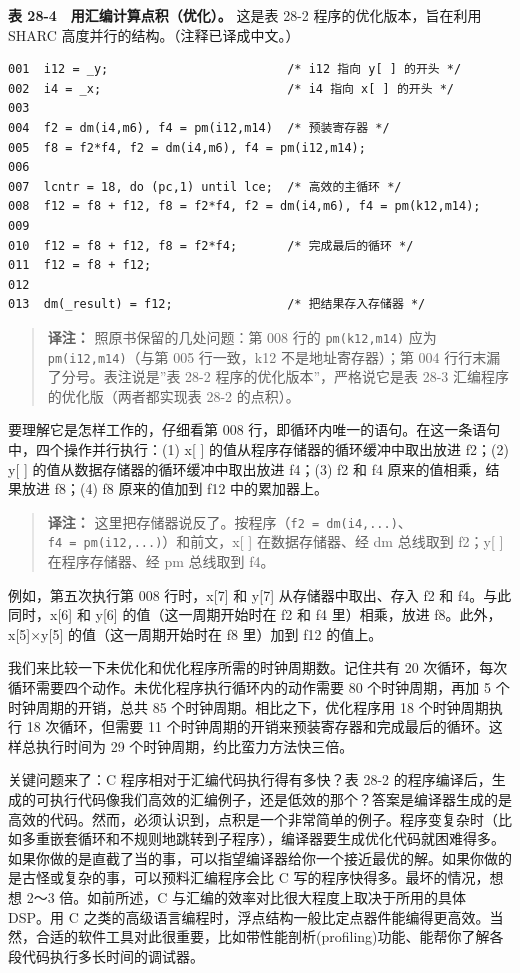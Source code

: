 \textbf{表 28-4　用汇编计算点积（优化）。} 这是表 28-2
程序的优化版本，旨在利用 SHARC 高度并行的结构。（注释已译成中文。）

\begin{verbatim}
001  i12 = _y;                         /* i12 指向 y[ ] 的开头 */
002  i4 = _x;                          /* i4 指向 x[ ] 的开头 */
003
004  f2 = dm(i4,m6), f4 = pm(i12,m14)  /* 预装寄存器 */
005  f8 = f2*f4, f2 = dm(i4,m6), f4 = pm(i12,m14);
006
007  lcntr = 18, do (pc,1) until lce;  /* 高效的主循环 */
008  f12 = f8 + f12, f8 = f2*f4, f2 = dm(i4,m6), f4 = pm(k12,m14);
009
010  f12 = f8 + f12, f8 = f2*f4;       /* 完成最后的循环 */
011  f12 = f8 + f12;
012
013  dm(_result) = f12;                /* 把结果存入存储器 */
\end{verbatim}

\begin{quote}
\textbf{译注：} 照原书保留的几处问题：第 008 行的 \texttt{pm(k12,m14)}
应为 \texttt{pm(i12,m14)}（与第 005 行一致，k12 不是地址寄存器）；第 004
行行末漏了分号。表注说是''表 28-2 程序的优化版本''，严格说它是表 28-3
汇编程序的优化版（两者都实现表 28-2 的点积）。
\end{quote}

要理解它是怎样工作的，仔细看第 008
行，即循环内唯一的语句。在这一条语句中，四个操作并行执行：(1) x{[} {]}
的值从程序存储器的循环缓冲中取出放进 f2；(2) y{[} {]}
的值从数据存储器的循环缓冲中取出放进 f4；(3) f2 和 f4
原来的值相乘，结果放进 f8；(4) f8 原来的值加到 f12 中的累加器上。

\begin{quote}
\textbf{译注：}
这里把存储器说反了。按程序（\texttt{f2\ =\ dm(i4,...)}、\texttt{f4\ =\ pm(i12,...)}）和前文，x{[}
{]} 在数据存储器、经 dm 总线取到 f2；y{[} {]} 在程序存储器、经 pm
总线取到 f4。
\end{quote}

例如，第五次执行第 008 行时，x{[}7{]} 和 y{[}7{]} 从存储器中取出、存入
f2 和 f4。与此同时，x{[}6{]} 和 y{[}6{]} 的值（这一周期开始时在 f2 和 f4
里）相乘，放进 f8。此外，x{[}5{]}×y{[}5{]} 的值（这一周期开始时在 f8
里）加到 f12 的值上。

我们来比较一下未优化和优化程序所需的时钟周期数。记住共有 20
次循环，每次循环需要四个动作。未优化程序执行循环内的动作需要 80
个时钟周期，再加 5 个时钟周期的开销，总共 85
个时钟周期。相比之下，优化程序用 18 个时钟周期执行 18 次循环，但需要 11
个时钟周期的开销来预装寄存器和完成最后的循环。这样总执行时间为 29
个时钟周期，约比蛮力方法快三倍。

关键问题来了：C 程序相对于汇编代码执行得有多快？表 28-2
的程序编译后，生成的可执行代码像我们高效的汇编例子，还是低效的那个？答案是编译器生成的是高效的代码。然而，必须认识到，点积是一个非常简单的例子。程序变复杂时（比如多重嵌套循环和不规则地跳转到子程序），编译器要生成优化代码就困难得多。如果你做的是直截了当的事，可以指望编译器给你一个接近最优的解。如果你做的是古怪或复杂的事，可以预料汇编程序会比
C 写的程序快得多。最坏的情况，想想 2～3 倍。如前所述，C
与汇编的效率对比很大程度上取决于所用的具体 DSP。用 C
之类的高级语言编程时，浮点结构一般比定点器件能编得更高效。当然，合适的软件工具对此很重要，比如带性能剖析(profiling)功能、能帮你了解各段代码执行多长时间的调试器。

